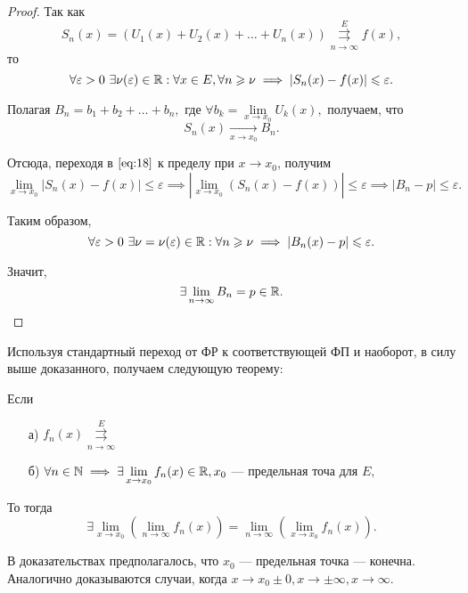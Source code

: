 \documentclass[../../main.tex]{subfiles}
\begin{document}
\begin{proof}
Так как 
\[
S_n(x) = (U_1(x) + U_2(x) + \ldots + U_n(x)) \overset{E}{\underset{n \to \infty}\rightrightarrows} f(x),
\]
 то
\begin{equation} \label{eq:18}
	\forall \varepsilon > 0 \ \exists \nu(\varepsilon) \in \mathbb{R} : \forall x \in E, \forall n \geqslant \nu \implies |S_n(x) - f(x)| \leqslant \varepsilon.
\end{equation}

	Полагая $B_n = b_1 + b_2 + \ldots + b_n,$ где $\forall b_k = \lim\limits_{x \to x_0}U_k(x),$
получаем, что 
\[
	S_n(x) \underset{x \to x_0}\longrightarrow B_n.
\]

Отсюда, переходя в $\eqref{eq:18}$ к пределу при $x \to x_0$, получим
\[
 \lim_{x \to x_0}|S_n(x) - f(x)| \le \varepsilon \implies
 |\lim_{x \to x_0}(S_n(x) - f(x))| \le \varepsilon \implies |B_n - p| \le \varepsilon.
\]

Таким образом, 
\[
\forall \varepsilon > 0 \ \exists \nu = \nu(\varepsilon) \in \mathbb{R} : \forall n \geqslant \nu \implies |B_n(x) - p| \leqslant \varepsilon.
\]

Значит, 
\[
\exists \lim_{n \to \infty} B_n = p \in \mathbb{R}.
\]
\end{proof}

\begin{rem}[1]
	Используя стандартный переход от ФР к соответствующей ФП и наоборот, в силу выше доказанного, получаем следующую теорему:
\end{rem}
\begin{thm}
	Если
	\begin{enumerate}
		\item[а)] $f_n(x) \overset{E}{\underset{n \to \infty}\rightrightarrows}$
		\item[б)] $\forall n \in \mathbb{N} \implies \exists \lim\limits_{x\to x_0}f_n(x) \in \mathbb{R}, x_0$ --- предельная точа для $E,$
	\end{enumerate} 
То тогда 
\[
	\exists \lim_{x \to x_0}(\lim_{n \to \infty}f_n(x)) = \lim_{n \to \infty}( \lim_{x \to x_0}f_n(x)).
\]
\end{thm}

\begin{rem}
	В доказательствах предполагалось, что $x_0$ --- предельная точка --- конечна. Аналогично доказываются случаи, когда $x \to x_0 \pm 0, x \to \pm \infty, x \to \infty.$
\end{rem}
\end{document}
